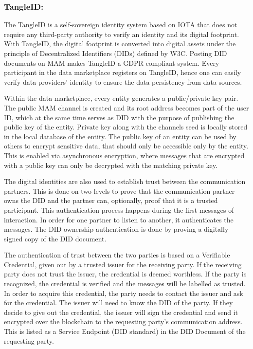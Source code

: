 \documentclass[conference]{IEEEtran}
\begin{document}
\subsubsection{TangleID: }
The TangleID\cite{TangleID} is a self-sovereign identity system based on IOTA that does not require any third-party authority to verify an identity and its digital footprint. With TangleID, the digital footprint is converted into digital assets under the principle of Decentralized Identifiers (DIDs)\cite{DID} defined by W3C. Posting DID documents on MAM makes TangleID a GDPR-compliant system\cite{GDPR}. Every participant in the data marketplace registers on TangleID, hence one can easily verify data providers' identity to ensure the data persistency from data sources.

Within the data marketplace, every entity generates a public/private key pair. The public MAM channel is created and its root address becomes part of the user ID, which at the same time serves as DID with the purpose of publishing the public key of the entity. Private key along with the channels seed is locally stored in the local database of the entity. The public key of an entity can be used by others to encrypt sensitive data, that should only be accessible only by the entity. This is enabled via asynchronous encryption, where messages that are encrypted with a public key can only be decrypted with the matching private key.

The digital identities are also used to establish trust between the communication partners. This is done on two levels to prove that the communication partner owns the DID and the partner can, optionally, proof that it is a trusted participant. This authentication process happens during the first messages of interaction. In order for one partner to listen to another, it authenticates the messages. The DID ownership authentication is done by proving a digitally signed copy of the DID document.

The authentication of trust between the two parties is based on a Verifiable Credential, given out by a trusted issuer for the receiving party. If the receiving party does not trust the issuer, the credential is deemed worthless. If the party is recognized, the credential is verified and the messages will be labelled as trusted. In order to acquire this credential, the party needs to contact the issuer and ask for the credential. The issuer will need to know the DID of the party. If they decide to give out the credential, the issuer will sign the credential and send it encrypted over the blockchain to the requesting party's communication address. This is listed as a Service Endpoint (DID standard) in the DID Document of the requesting party.
\end{document}
